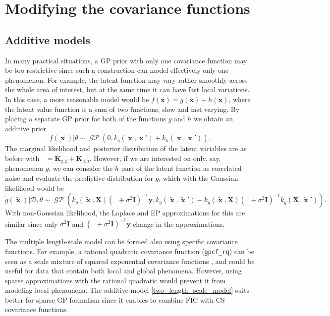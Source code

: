 \documentclass[twoside,11pt]{article}
\DeclareMathOperator{\Kff}{\mathbf{K}_{f,f}}
\DeclareMathOperator{\x}{\mathbf{x}}
\DeclareMathOperator{\GP}{\mathcal{GP}}
\newcommand{\mb}{\mathbf}
\newcommand{\code}[1]{{\normalfont\texttt{#1}}}
\begin{document}
\section{Modifying the covariance functions}\label{sec:modifying_covariance}

\subsection{Additive models}\label{sec_additive_models}

In many practical situations, a GP prior with only one covariance
function may be too restrictive since such a construction can model
effectively only one phenomenon. For example, the latent function may
vary rather smoothly across the whole area of interest, but at the
same time it can have fast local variations. In this case, a more
reasonable model would be $f(\mb{x}) = g(\mb{x}) + h(\mb{x})$, where
the latent value function is a sum of two functions, slow and fast
varying. By placing a separate GP prior for both of the functions $g$
and $h$ we obtain an additive prior
%
\begin{equation}\label{two_length_scale_model}
f(\x)|\theta \sim \GP(0,k_g(\x,\x') + k_h(\x,\x')).
\end{equation}
%
The marginal likelihood and posterior distribution of the latent
variables are as before with $\Kff = \mb{K}_{\text{g,g}} +
\mb{K}_{\text{h,h}}$. However, if we are interested on only, say,
phenomenon $g$, we can consider the $h$ part of the latent function as
correlated noise and evaluate the predictive distribution for $g$,
which with the Gaussian likelihood would be
%
\begin{equation}
  \tilde{g}(\tilde{\x})|\mathcal{D},
  \theta \sim \GP\left(k_g(\tilde{\x},\mb{X})(\Kff + \sigma^2\mb{I})^{-1}\mb{y}, 
    k_g(\tilde{\x},\tilde{\x}') -
    k_g(\tilde{\x},\mb{X})(\Kff + \sigma^2\mb{I})^{-1}  k_g(\mb{X},\tilde{\x}')\right).
\end{equation}
%
With non-Gaussian likelihood, the Laplace and EP approximations for
this are similar since only $\sigma^2\mb{I}$ and $(\Kff +
\sigma^2\mb{I})^{-1}\mb{y}$ change in the approximations.

The multiple length-scale model can be formed also using specific
covariance functions. For example, a rational quadratic covariance
function (\code{gpcf\_rq}) can be seen as a scale mixture of squared
exponential covariance functions \citep{Rasmussen+Williams:2006}, and
could be useful for data that contain both local and global phenomena.
However, using sparse approximations with the rational quadratic would
prevent it from modeling local phenomena. The additive model
\eqref{two_length_scale_model} suits better for sparse GP formalism
since it enables to combine FIC with CS covariance functions.
\end{document}
